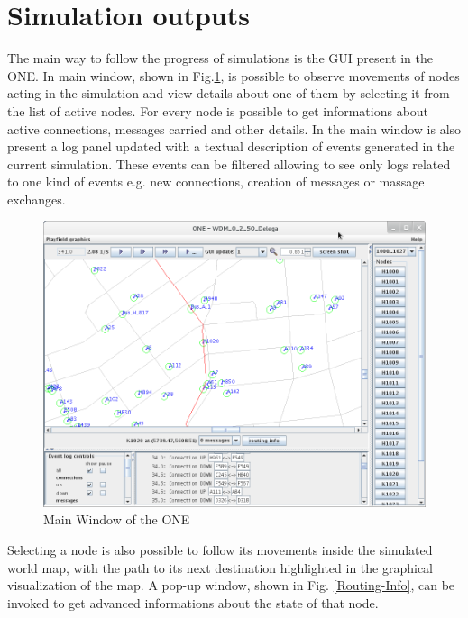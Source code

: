 \section{Simulation outputs}
The main way to follow the progress of simulations is the GUI present in the ONE. In main window, shown in Fig.\ref{Schermata-ONE}, is possible to observe movements of nodes acting in the simulation and view details about one of them by selecting it from the list of active nodes. For every node is possible to get informations about active connections, messages carried and other details. In the main window is also present a log panel updated with a textual description of events generated in the current simulation. These events can be filtered allowing to see only logs related to one kind of events e.g. new connections, creation of messages or massage exchanges.
\\
\begin{figure}[htpb]
  \begin{center}
    \includegraphics[scale=0.4]{5-simulatore/img/Schermata-ONE.png}
    \caption[Main window]{Main Window of the ONE}    
    \label{Schermata-ONE}
  \end{center}
\end{figure}

Selecting a node is also possible to follow its movements inside the simulated world map, with the path to its next destination highlighted in the graphical visualization of the map. A pop-up window, shown in Fig. \ref{Routing-Info}, can be invoked to get advanced informations about the state of that node.
\\

